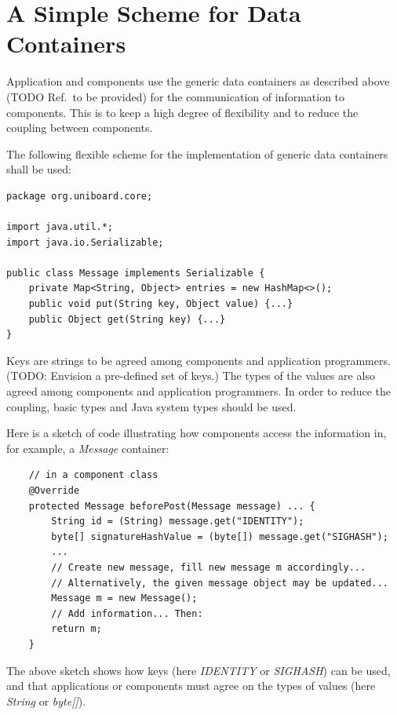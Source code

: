 \documentclass[oneside]{scrreprt}
\begin{document}
\section{A Simple Scheme for Data Containers}

Application and components use the generic data containers
as described above (TODO Ref.\ to be provided) for the
communication of information to components. This is to keep a high
degree of flexibility and to reduce the coupling between
components.

The following flexible scheme for the implementation of generic
data containers shall be used:

\begin{lstlisting}
package org.uniboard.core;

import java.util.*;
import java.io.Serializable;

public class Message implements Serializable {
    private Map<String, Object> entries = new HashMap<>();
    public void put(String key, Object value) {...}
    public Object get(String key) {...}
}
\end{lstlisting}

Keys are strings to be agreed among components and application
programmers. (TODO: Envision a pre-defined set of keys.)
The types of the values are also
agreed among components and application programmers.
In order to reduce the
coupling, basic types and Java system types should be used.

Here is a sketch of code illustrating how components access
the information in, for example, a \emph{Message} container:

\begin{lstlisting}
    // in a component class
    @Override
    protected Message beforePost(Message message) ... {
        String id = (String) message.get("IDENTITY");
        byte[] signatureHashValue = (byte[]) message.get("SIGHASH");
        ...
        // Create new message, fill new message m accordingly...
        // Alternatively, the given message object may be updated...
        Message m = new Message();
        // Add information... Then:
        return m;
    }
\end{lstlisting}

The above sketch shows how keys (here \emph{IDENTITY} or \emph{SIGHASH})
can be used, and that applications or components must agree on
the types of values (here \emph{String} or \emph{byte[]}).

 
\end{document}
